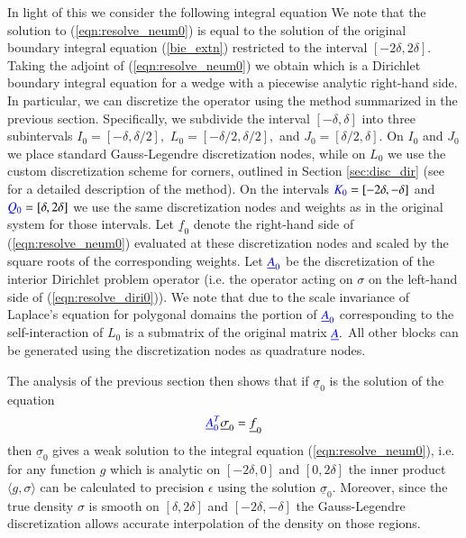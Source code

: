 In light of this we consider the following integral equation
We note that the solution to (\ref{eqn:resolve_neum0}) is equal to the solution of the original boundary integral equation (\ref{bie_extn}) restricted to the interval $[-2\delta,2\delta].$ Taking the adjoint of (\ref{eqn:resolve_neum0}) we obtain
which is a Dirichlet boundary integral equation for a wedge with a piecewise analytic right-hand side. In particular, we can discretize the operator using the method summarized in the previous section. Specifically, we subdivide the interval $[-\delta,\delta]$ into three subintervals $I_0 = [-\delta,\delta/2],$ $L_0 = [-\delta/2,\delta/2],$ and $J_0 = [\delta/2,\delta].$ On $I_0$ and $J_0$ we place standard Gauss-Legendre discretization nodes, while on $L_0$ we use the custom discretization scheme for corners, outlined in Section \ref{sec:disc_dir} (see \cite{hoskins2019numerical} for a detailed description of the method). On the intervals ${\color{blue} K_0}=[-2\delta,-\delta]$ and ${\color{blue} Q_0}=[\delta,2\delta]$ we use the same discretization nodes and weights as in the original system for those intervals. Let $\underline{f}_0$ denote the right-hand side of (\ref{eqn:resolve_neum0}) evaluated at these discretization nodes and scaled by the square roots of the corresponding weights. Let ${\color{blue} \underline{A}_0}$ be the discretization of the interior Dirichlet problem operator (i.e. the operator acting on $\sigma$ on the left-hand side of (\ref{eqn:resolve_diri0})). We note that due to the scale invariance of Laplace's equation for polygonal domains the portion of ${\color{blue} \underline{A}_0}$ corresponding to the self-interaction of $L_0$ is a submatrix of the original matrix ${\color{blue} \underline{A}}.$ All other blocks can be generated using the discretization nodes as quadrature nodes.

The analysis of the previous section then shows that if $\underline{\sigma}_0$ is the solution of the equation
\begin{align}\label{eqn_reduced}
{\color{blue} \underline{A}_0^T} \underline{\sigma}_0 = \underline{f}_0
\end{align}
then $\underline{\sigma}_0$ gives a {weak solution} to the integral equation (\ref{eqn:resolve_neum0}), i.e. for any function $g$ which is analytic on $[-2\delta,0]$ and $[0,2\delta]$ the inner product $\langle g,\sigma \rangle$ can be calculated to precision $\epsilon$ using the solution $\underline{\sigma}_0.$ Moreover, since the true density $\sigma$ is smooth on $[\delta,2\delta]$ and $[-2\delta,-\delta]$ the Gauss-Legendre discretization allows accurate interpolation of the density on those regions.

